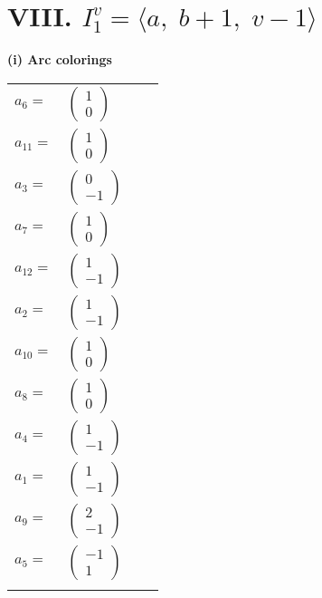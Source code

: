 \documentclass[1p]{elsarticle_modified}
\theoremstyle{definition}
\begin{document}
\centering \section*{VIII. $I^v_{1}= \langle a,\;b+1,\;v-1 \rangle$}
\flushleft \textbf{(i) Arc colorings}\\
\begin{tabular}{m{7pt} m{180pt} m{7pt} m{180pt} }
\flushright $a_{6}=$&$\begin{pmatrix}1\\0\end{pmatrix}$ \\
\flushright $a_{11}=$&$\begin{pmatrix}1\\0\end{pmatrix}$ \\
\flushright $a_{3}=$&$\begin{pmatrix}0\\-1\end{pmatrix}$ \\
\flushright $a_{7}=$&$\begin{pmatrix}1\\0\end{pmatrix}$ \\
\flushright $a_{12}=$&$\begin{pmatrix}1\\-1\end{pmatrix}$ \\
\flushright $a_{2}=$&$\begin{pmatrix}1\\-1\end{pmatrix}$ \\
\flushright $a_{10}=$&$\begin{pmatrix}1\\0\end{pmatrix}$ \\
\flushright $a_{8}=$&$\begin{pmatrix}1\\0\end{pmatrix}$ \\
\flushright $a_{4}=$&$\begin{pmatrix}1\\-1\end{pmatrix}$ \\
\flushright $a_{1}=$&$\begin{pmatrix}1\\-1\end{pmatrix}$ \\
\flushright $a_{9}=$&$\begin{pmatrix}2\\-1\end{pmatrix}$ \\
\flushright $a_{5}=$&$\begin{pmatrix}-1\\1\end{pmatrix}$\\&\end{tabular}
\end{document}

